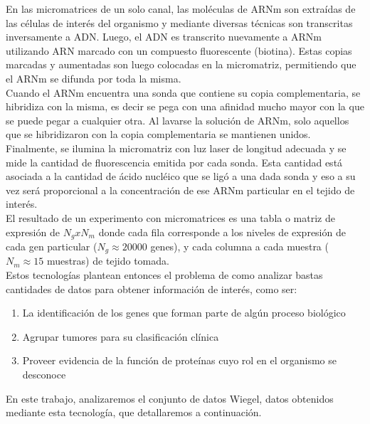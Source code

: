 En las micromatrices de un solo canal, las moléculas de ARNm son extraídas de las células de interés del organismo y mediante diversas técnicas son transcritas inversamente a ADN. Luego, el ADN es transcrito nuevamente a ARNm utilizando ARN marcado con un compuesto fluorescente (biotina). Estas copias marcadas y aumentadas son luego colocadas en la micromatriz, permitiendo que el ARNm se difunda por toda la misma.\\
Cuando el ARNm encuentra una sonda que contiene su copia complementaria, se hibridiza con la misma, es decir se pega con una afinidad mucho mayor con la que se puede pegar a cualquier otra. Al lavarse la solución de ARNm, solo aquellos que se hibridizaron con la copia complementaria se mantienen unidos. Finalmente, se ilumina la micromatriz con luz laser de longitud adecuada y se mide la cantidad de fluorescencia emitida por cada sonda. Esta cantidad está asociada a la cantidad de ácido nucléico que se ligó a una dada sonda y eso a su vez será proporcional a la concentración de ese ARNm particular en el tejido de interés.\\
El resultado de un experimento con micromatrices es una tabla o matriz de expresión de $N_g x N_m$ donde cada fila corresponde a los niveles de expresión de cada gen particular ($N_g \approx 20000$ genes), y cada columna a cada muestra ($N_m \approx 15$ muestras) de tejido tomada.\\
Estos tecnologías plantean entonces el problema de como analizar bastas cantidades de datos para obtener información de interés, como ser:
\begin{enumerate}
	\item La identificación de los genes que forman parte de algún proceso biológico
	\item Agrupar tumores para su clasificación clínica
	\item Proveer evidencia de la función de proteínas cuyo rol en el organismo se desconoce
\end{enumerate}
En este trabajo, analizaremos el conjunto de datos Wiegel, datos obtenidos mediante esta tecnología, que detallaremos a continuación.\cite{Babu2004,Schulze2001,Domany2003}
